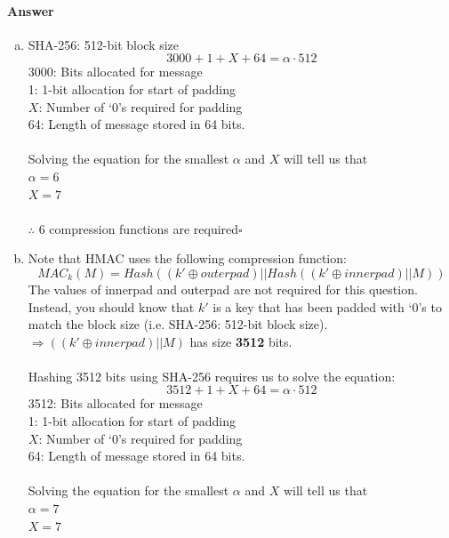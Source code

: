 \documentclass[12pt]{article}
\newcommand{\EOQ}{\hfill $\square$}
\begin{document}
\paragraph{Answer}
\begin{enumerate}[(a)]
\item SHA-256: 512-bit block size
\begin{equation*}
3000 + 1 + X + 64=\alpha \cdot 512
\end{equation*}
3000: Bits allocated for message\\
1: 1-bit allocation for start of padding\\
$X$: Number of `0's required for padding\\
64: Length of message stored in 64 bits.\\\\
Solving the equation for the smallest $\alpha$ and $X$ will tell us that
\\$\alpha=6$\\$X=7$\\\\
$\therefore$ 6 compression functions are required\EOQ
\item Note that HMAC uses the following compression function:
\begin{equation*}
MAC_k(M)=Hash((k'\oplus outerpad)||Hash((k'\oplus innerpad)||M))
\end{equation*}
The values of innerpad and outerpad are not required for this question. Instead, you should know that $k'$ is a key that has been padded with `0's to match the block size (i.e. SHA-256: 512-bit block size).\\
$\Rightarrow ((k'\oplus innerpad) || M)$ has size \textbf{3512} bits.\\\\
Hashing 3512 bits using SHA-256 requires us to solve the equation:
\begin{equation*}
3512+1+X+64=\alpha\cdot 512
\end{equation*}
3512: Bits allocated for message\\
1: 1-bit allocation for start of padding\\
$X$: Number of `0's required for padding\\
64: Length of message stored in 64 bits.\\\\
Solving the equation for the smallest $\alpha$ and $X$ will tell us that
\\$\alpha=7$\\$X=7$\\\\

\end{enumerate}
\end{document}
